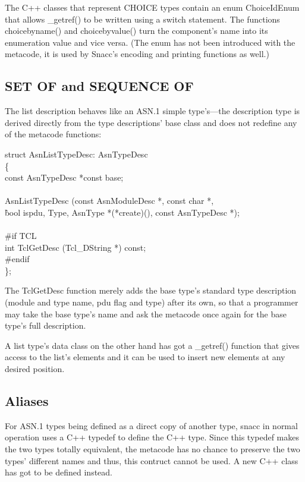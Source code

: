 The C++ classes that represent CHOICE types contain an {\C enum ChoiceIdEnum} that allows {\C \_getref()} to be written using a {\C switch} statement.
The functions {\C choicebyname()} and {\C choicebyvalue()} turn the component's name into its enumeration value and vice versa.
(The enum has not been introduced with the metacode, it is used by Snacc's encoding and printing functions as well.)

\subsection{\label{meta-list}SET OF and SEQUENCE OF}

The list description behaves like an ASN.1 simple type's---the description type is derived directly from the type descriptions' base class and does not redefine any of the metacode functions:

\begin{Ccode}
struct AsnListTypeDesc: AsnTypeDesc\\
\{\+\\
  const AsnTypeDesc		\>\>*const base;\\
\\
  				\>\>AsnListTypeDesc (const AsnModuleDesc *, const char *,\\
					\`bool ispdu, Type, AsnType *(*create)(), const AsnTypeDesc *);\-\\
\\
\#if TCL\\
  \>int				\>\>TclGetDesc (Tcl\_DString *) const;\\
\#endif\\
\};
\end{Ccode}

The {\C TclGetDesc} function merely adds the base type's standard type description (module and type name, pdu flag and type) after its own, so that a programmer may take the base type's name and ask the metacode once again for the base type's full description.

A list type's data class on the other hand has got a {\C \_getref()} function that gives access to the list's elements and it can be used to insert new elements at any desired position.

\subsection{\label{meta-aliases}Aliases}

For ASN.1 types being defined as a direct copy of another type, snacc in normal operation uses a C++ {\C typedef} to define the C++ type.
Since this {\C typedef} makes the two types totally equivalent, the metacode has no chance to preserve the two types' different names and thus, this contruct cannot be used.
A new C++ class has got to be defined instead.

